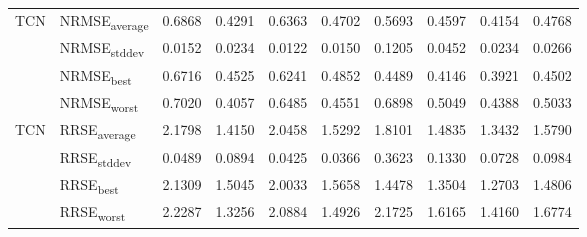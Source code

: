 {\begin{longtable}{l l c c c c c c c c}
\cmidrule(lr){2-10}
\multirow{4}{*}{TCN} & NRMSE\textsubscript{average} & 0.6868 & 0.4291 & 0.6363 & 0.4702 & 0.5693 & 0.4597 & 0.4154 & 0.4768 \\
 & NRMSE\textsubscript{stddev} & 0.0152 & 0.0234 & 0.0122 & 0.0150 & 0.1205 & 0.0452 & 0.0234 & 0.0266 \\
 & NRMSE\textsubscript{best} & 0.6716 & 0.4525 & 0.6241 & 0.4852 & 0.4489 & 0.4146 & 0.3921 & 0.4502 \\
 & NRMSE\textsubscript{worst} & 0.7020 & 0.4057 & 0.6485 & 0.4551 & 0.6898 & 0.5049 & 0.4388 & 0.5033 \\
\cmidrule(lr){2-10}
\multirow{4}{*}{TCN} & RRSE\textsubscript{average} & 2.1798 & 1.4150 & 2.0458 & 1.5292 & 1.8101 & 1.4835 & 1.3432 & 1.5790 \\
 & RRSE\textsubscript{stddev} & 0.0489 & 0.0894 & 0.0425 & 0.0366 & 0.3623 & 0.1330 & 0.0728 & 0.0984 \\
 & RRSE\textsubscript{best} & 2.1309 & 1.5045 & 2.0033 & 1.5658 & 1.4478 & 1.3504 & 1.2703 & 1.4806 \\
 & RRSE\textsubscript{worst} & 2.2287 & 1.3256 & 2.0884 & 1.4926 & 2.1725 & 1.6165 & 1.4160 & 1.6774 \\
\cmidrule(lr){2-10}
\end{longtable}
}